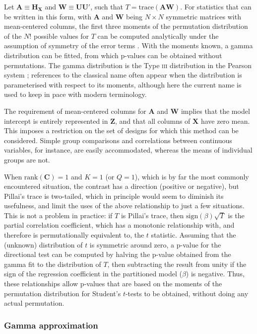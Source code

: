 Let $\mathbf{A} \equiv \mathbf{H}_\mathbf{X}$ and $\mathbf{W} \equiv \mathbf{U}\mathbf{U}'$, such that $T=\text{trace}(\mathbf{A}\mathbf{W})$. For statistics that can be written in this form, with $\mathbf{A}$ and $\mathbf{W}$ being $N \times N$ symmetric matrices with mean-centered columns, the first three moments of the permutation distribution of the $N!$ possible values for $T$ can be computed analytically under the assumption of symmetry of the error terms \citep{Box1962, Mardia1971, Kazi-Aoual1995}. With the moments known, a gamma distribution can be fitted, from which p-values can be obtained without permutations. The gamma distribution is the Type \textsc{iii} distribution in the Pearson system \citep{Pearson1895}; references to the classical name often appear when the distribution is parameterised with respect to its moments, although here the current name is used to keep in pace with modern terminology.

The requirement of mean-centered columns for $\mathbf{A}$ and $\mathbf{W}$ implies that the model intercept is entirely represented in $\mathbf{Z}$, and that all columns of $\mathbf{X}$ have zero mean. This imposes a restriction on the set of designs for which this method can be considered. Simple group comparisons and correlations between continuous variables, for instance, are easily accommodated, whereas the means of individual groups are not.

When $\text{rank}(\mathbf{C})=1$ and $K=1$ (or $Q=1$), which is by far the most commonly encountered situation, the contrast has a direction (positive or negative), but Pillai's trace is two-tailed, which in principle would seem to diminish its usefulness, and limit the uses of the above relationship to just a few situations. This is not a problem in practice: if $T$ is Pillai's trace, then $\text{sign}(\beta)\sqrt{T}$ is the partial correlation coefficient, which has a monotonic relationship with, and therefore is permutationally equivalent to, the $t$ statistic. Assuming that the (unknown) distribution of $t$ is symmetric around zero, a p-value for the directional test can be computed by halving the p-value obtained from the gamma fit to the distribution of $T$, then subtracting the result from unity if the sign of the regression coefficient in the partitioned model ($\beta$) is negative. Thus, these relationships allow p-values that are based on the moments of the permutation distribution for Student's $t$-tests to be obtained, without doing any actual permutation.

\subsubsection{Gamma approximation}

